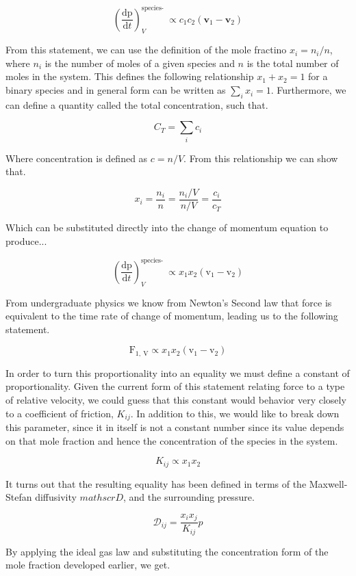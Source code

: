 \documentclass[lettersize,journal]{IEEEtran}
\begin{document}
\[
\left(\frac{\mathrm{dp}}{\mathrm{d} t}\right)_{V}^{\text {species- }} \propto c_{1} c_{2}\left(\mathbf{v}_{1}-\mathbf{v}_{2}\right)
\]


From this statement, we can use the definition of the mole fractino $x_i = n_i /n$, where $n_i$ is the number of moles of a given species and $n$ is the total number of moles in the system. This defines the following relationship $x_1 + x_2 = 1$ for a binary species and in general form can be written as $\sum_i x_i = 1$. Furthermore, we can define a quantity called the total concentration, such that.

\[
C_{T}=\sum_{i} c_{i}
\]

Where concentration is defined as $c = n/ V$.  From this relationship we can show that.

\[
x_{i}=\frac{n_{i}}{n}=\frac{n_{i} / V}{n / V}=\frac{c_{i}}{c_{T}}
\]

Which can be substituted directly into the change of momentum equation to produce...

\[
\left(\frac{\mathrm{d} \mathrm{p}}{\mathrm{d} t}\right)_{V}^{\text {species- }} \propto x_{1} x_{2}\left(\mathrm{v}_{1}-\mathrm{v}_{2}\right)
\]


From undergraduate physics we know from Newton's Second law that force is equivalent to the time rate of change of momentum, leading us to the following statement.

\[
\mathrm{F}_{1, \mathrm{~V}} \propto x_{1} x_{2}\left(\mathrm{v}_{1}-\mathrm{v}_{2}\right)
\]

In order to turn this proportionality into an equality we must define a constant of proportionality. Given the current form of this statement relating force to a type of relative velocity, we could guess that this constant would behavior very closely to a coefficient of friction, $K_{ij}$. In addition to this, we would like to break down this parameter, since it in itself is not a constant number since its value depends on that mole fraction and hence the concentration of the species in the system.

\[
  K_{i j} \propto x_{1}x_{2}
\]

It turns out that the resulting equality has been defined in terms of the Maxwell-Stefan diffusivity $mathscr{D}$, and the surrounding pressure.

\[
\mathscr{D}_{i j}=\frac{x_{i} x_{j}}{K_{i j}} p
\]

By applying the ideal gas law and substituting the concentration form of the mole fraction developed earlier, we get.
\end{document}
